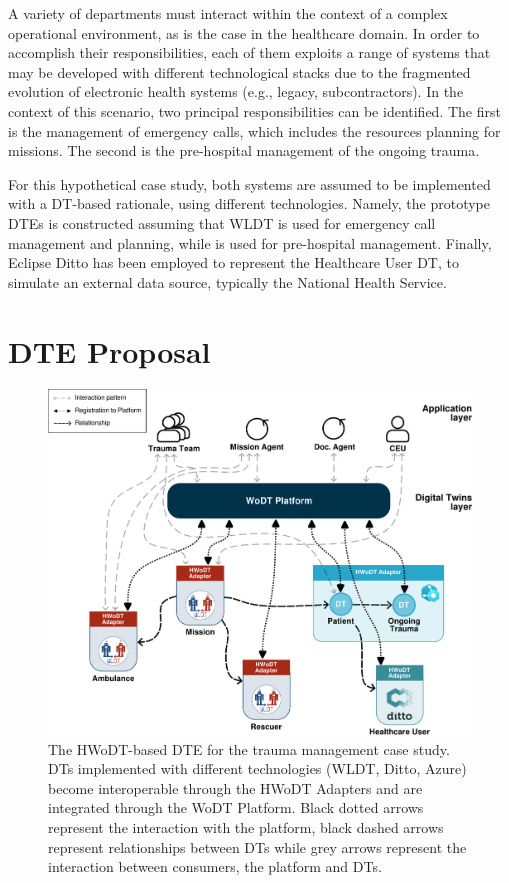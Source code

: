 A variety of departments must interact within the context of a complex operational environment, as is the case in the healthcare domain. In order to accomplish their responsibilities, each of them exploits a range of systems that may be developed with different technological stacks due to the fragmented evolution of electronic health systems (e.g., legacy, subcontractors).
%
In the context of this scenario, two principal responsibilities can be identified. The first is the management of emergency calls, which includes the resources planning for missions. The second is the pre-hospital management of the ongoing trauma.

For this hypothetical case study, both systems are assumed to be implemented with a \ac{DT}-based rationale, using different technologies.
%
Namely, the prototype \acp{DTE} is constructed assuming that
\acl{WLDT} is used for emergency call management and planning, while \azureTwin{} is used for pre-hospital management. Finally, Eclipse Ditto has been employed to represent the Healthcare User \ac{DT}, to simulate an external data source, typically the National Health Service.

\section{\acl{DTE} Proposal}

\begin{figure}
  \centering
  \includegraphics[width=\columnwidth]{figures/hwodt/major-trauma-management.pdf}
  \caption{The \ac{HWoDT}-based \ac{DTE} for the trauma management case study. \acp{DT} implemented with different technologies (WLDT, Ditto, Azure) become interoperable through the HWoDT Adapters and are integrated through the WoDT Platform. 
  Black dotted arrows represent the interaction with the platform, black dashed arrows represent relationships between \acp{DT} while grey arrows represent the interaction between consumers, the platform and \acp{DT}.
  }
  \label{fig:trauma-use-case-diagram}
\end{figure}

